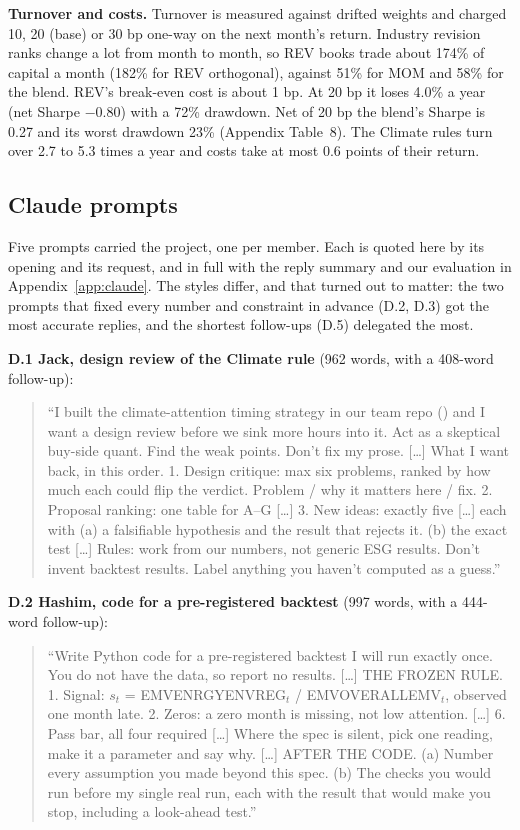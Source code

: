 \documentclass[11pt]{article}
\newenvironment{promptbox}{\begin{quote}\small\sloppy\setlength{\parskip}{0.3em}}{\end{quote}}
\begin{document}
\textbf{Turnover and costs.} Turnover is measured against drifted weights and charged 10, 20 (base) or 30 bp one-way on the next month's return. Industry revision ranks change a lot from month to month, so REV books trade about 174\% of capital a month (182\% for REV orthogonal), against 51\% for MOM and 58\% for the blend. REV's break-even cost is about 1 bp. At 20 bp it loses 4.0\% a year (net Sharpe $-0.80$) with a 72\% drawdown. Net of 20 bp the blend's Sharpe is 0.27 and its worst drawdown 23\% (Appendix Table~8). The Climate rules turn over 2.7 to 5.3 times a year and costs take at most 0.6 points of their return.

\subsection{Claude prompts}
\label{sec:prompts}

Five prompts carried the project, one per member. Each is quoted here by its opening and its request, and in full with the reply summary and our evaluation in Appendix~\ref{app:claude}. The styles differ, and that turned out to matter: the two prompts that fixed every number and constraint in advance (D.2, D.3) got the most accurate replies, and the shortest follow-ups (D.5) delegated the most.

\textbf{D.1 Jack, design review of the Climate rule} (962 words, with a 408-word follow-up):
\begin{promptbox}
``I built the climate-attention timing strategy in our team repo () and I want a design review before we sink more hours into it. Act as a skeptical buy-side quant. Find the weak points. Don't fix my prose. [\ldots] What I want back, in this order. 1. Design critique: max six problems, ranked by how much each could flip the verdict. Problem / why it matters here / fix. 2. Proposal ranking: one table for A--G [\ldots] 3. New ideas: exactly five [\ldots] each with (a) a falsifiable hypothesis and the result that rejects it. (b) the exact test [\ldots] Rules: work from our numbers, not generic ESG results. Don't invent backtest results. Label anything you haven't computed as a guess.''
\end{promptbox}

\textbf{D.2 Hashim, code for a pre-registered backtest} (997 words, with a 444-word follow-up):
\begin{promptbox}
``Write Python code for a pre-registered backtest I will run exactly once. You do not have the data, so report no results. [\ldots] THE FROZEN RULE. 1. Signal: $s_t$ = EMVENRGYENVREG$_t$ / EMVOVERALLEMV$_t$, observed one month late. 2. Zeros: a zero month is missing, not low attention. [\ldots] 6. Pass bar, all four required [\ldots] Where the spec is silent, pick one reading, make it a parameter and say why. [\ldots] AFTER THE CODE. (a) Number every assumption you made beyond this spec. (b) The checks you would run before my single real run, each with the result that would make you stop, including a look-ahead test.''
\end{promptbox}
\end{document}
